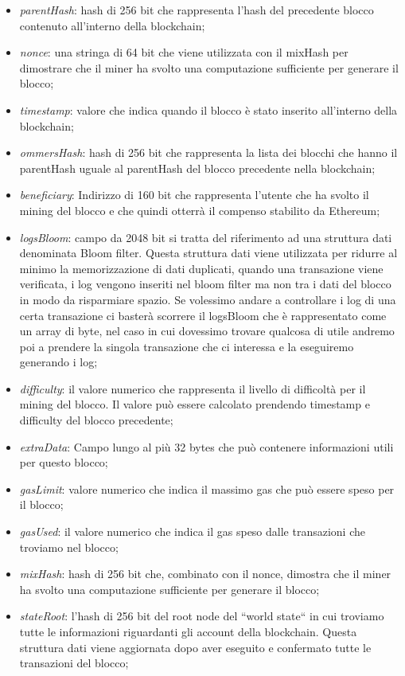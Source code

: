 \documentclass[12pt]{report}
\begin{document}
\begin{itemize}
\item \textit{parentHash}: hash di 256 bit che rappresenta l'hash del precedente blocco contenuto all'interno della blockchain;
\item \textit{nonce}: una stringa di 64 bit che viene utilizzata con il mixHash per dimostrare che il miner ha svolto una computazione sufficiente per generare il blocco;
\item \textit{timestamp}: valore che indica quando il blocco è stato inserito all'interno della blockchain;
\item \textit{ommersHash}: hash di 256 bit che rappresenta la lista dei blocchi che hanno il parentHash uguale al parentHash del blocco precedente nella blockchain;
\item \textit{beneficiary}: Indirizzo di 160 bit che rappresenta l'utente che ha svolto il mining del blocco e che quindi otterrà il compenso stabilito da Ethereum;
\item \textit{logsBloom}: campo da 2048 bit si tratta del riferimento ad una struttura dati denominata Bloom filter. 
Questa struttura dati viene utilizzata per ridurre al minimo la memorizzazione di dati duplicati, quando una transazione viene verificata, i log vengono inseriti nel bloom filter ma non tra i dati del blocco in modo da risparmiare spazio.
Se volessimo andare a controllare i log di una certa transazione ci basterà scorrere il logsBloom che è rappresentato come un array di byte, nel caso in cui dovessimo trovare qualcosa di utile andremo poi a prendere la singola transazione che ci interessa e la eseguiremo generando i log; \cite {BloomFilter}
\item \textit{difficulty}: il valore numerico che rappresenta il livello di difficoltà per il mining del blocco. Il valore può essere calcolato prendendo timestamp e difficulty del blocco precedente;
\item \textit{extraData}: Campo lungo al più 32 bytes che può contenere informazioni utili per questo blocco;
\item \textit{gasLimit}: valore numerico che indica il massimo gas che può essere speso per il blocco;
\item \textit{gasUsed}: il valore numerico che indica il gas speso dalle transazioni che troviamo nel blocco;
\item \textit{mixHash}: hash di 256 bit che, combinato con il nonce, dimostra che il miner ha svolto una computazione sufficiente per generare il blocco;
\item \textit{stateRoot}: l'hash di 256 bit del root node del ``world state`` in cui troviamo tutte le informazioni riguardanti gli account della blockchain. Questa struttura dati viene aggiornata dopo aver eseguito e confermato tutte le transazioni del blocco;

\end{itemize}
\end{document}
